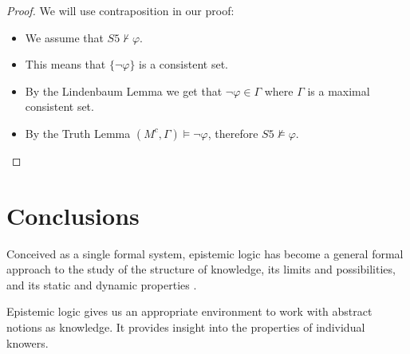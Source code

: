 \documentclass[12pt]{article}
\numberwithin{equation}{section}
\theoremstyle{definition}
\theoremstyle{definition}
\theoremstyle{remark}
\begin{document}
\begin{proof}

We will use contraposition in our proof:
\begin{itemize}
\item We assume that $S5 \nvdash \varphi$.
\item This means that $\{ \neg\varphi \}$ is a consistent set.

 \item By the Lindenbaum Lemma we get that $\neg \varphi \in \Gamma$ where $\Gamma$ is a maximal consistent set.
 
 \item By the Truth Lemma $(M^c, \Gamma) \models \neg \varphi$, therefore $S5 \not\models \varphi$.
\end{itemize}
\end{proof}

\section{Conclusions}
Conceived as a single formal system, epistemic logic has become a general formal approach to the study of the structure of knowledge, its limits and possibilities, and its static and dynamic properties \cite{art}.

Epistemic logic gives us an appropriate environment to work with abstract notions as knowledge. It provides insight into the properties of individual knowers.


\newpage





\end{document}
